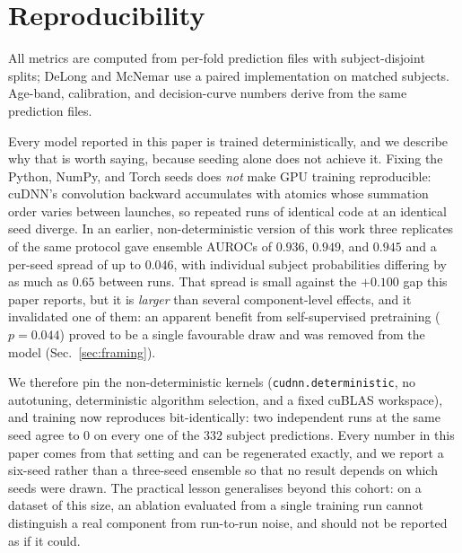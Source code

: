 \documentclass[journal]{IEEEtran}
\begin{document}
\section*{Reproducibility}
All metrics are computed from per-fold prediction files with subject-disjoint splits; DeLong and McNemar
use a paired implementation on matched subjects. Age-band, calibration, and decision-curve numbers derive
from the same prediction files.

Every model reported in this paper is trained deterministically, and we describe why that is worth
saying, because seeding alone does not achieve it. Fixing the Python, NumPy, and Torch seeds does
\emph{not} make GPU training reproducible: cuDNN's convolution backward accumulates with atomics whose
summation order varies between launches, so repeated runs of identical code at an identical seed
diverge. In an earlier, non-deterministic version of this work three replicates of the same protocol
gave ensemble AUROCs of $0.936$, $0.949$, and $0.945$ and a per-seed spread of up to $0.046$, with
individual subject probabilities differing by as much as $0.65$ between runs. That spread is small
against the $+0.100$ gap this paper reports, but it is \emph{larger} than several component-level
effects, and it invalidated one of them: an apparent benefit from self-supervised pretraining
($p=0.044$) proved to be a single favourable draw and was removed from the model
(Sec.~\ref{sec:framing}).

We therefore pin the non-deterministic kernels (\texttt{cudnn.deterministic}, no autotuning,
deterministic algorithm selection, and a fixed cuBLAS workspace), and training now reproduces
bit-identically: two independent runs at the same seed agree to $0$ on every one of the $332$ subject
predictions. Every number in this paper comes from that setting and can be regenerated exactly, and we
report a six-seed rather than a three-seed ensemble so that no result depends on which seeds were drawn.
The practical lesson generalises beyond this cohort: on a dataset of this size, an ablation evaluated
from a single training run cannot distinguish a real component from run-to-run noise, and should not be
reported as if it could.
\end{document}
